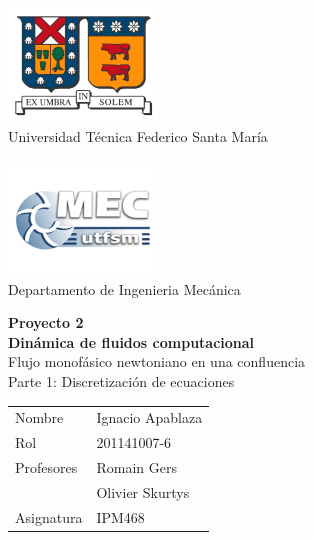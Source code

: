 \documentclass[12pt, a4paper]{article}
\begin{document}
\thispagestyle{empty}

\hspace{-5mm}
\begin{minipage}[c]{7cm}
\centering
\includegraphics[width=4cm]{logoutfsm.jpg} \\
Universidad Técnica Federico Santa María
\end{minipage}
\hfill
\hspace{20mm}
\begin{minipage}[c]{7cm}
\centering
\includegraphics[width=4cm]{logomec1.jpg} \\
Departamento de Ingenieria Mecánica
\end{minipage}

\begin{center}
\vfill
 \Huge{{\bf Proyecto 2 }} \\ 
 \Huge{ {\bf Dinámica de fluidos computacional}} \\ \vspace{1cm}
 \Large{Flujo monofásico newtoniano en una confluencia} \\
 \Large{Parte 1: Discretización de ecuaciones} 
\vfill
\end{center}

\vfill \hfill
\begin{tabular}{l @{ : } l}
Nombre &   Ignacio Apablaza \\
Rol & 201141007-6  \\
Profesores & Romain Gers \\
			& Olivier Skurtys \\
Asignatura & IPM468 \\
\end{tabular}

\newpage


\tableofcontents


\newpage
\end{document}
